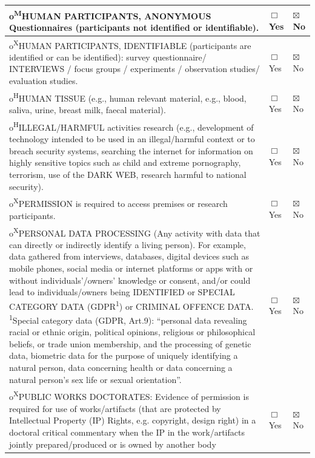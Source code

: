 \documentclass[12pt,a4paper]{article}
\begin{document}
\begin{longtable}{|p{10.3cm}|p{1.4cm}|p{1.4cm}|}
{\ttfamily o}\quad \textsuperscript{M}HUMAN PARTICIPANTS, ANONYMOUS Questionnaires (participants not identified or identifiable). & $\Box$ Yes & $\boxtimes$ No \\ \hline
{\ttfamily o}\quad \textsuperscript{X}HUMAN PARTICIPANTS, IDENTIFIABLE (participants are identified or can be identified): survey questionnaire/ INTERVIEWS / focus groups / experiments / observation studies/ evaluation studies. & $\Box$ Yes & $\boxtimes$ No \\ \hline
{\ttfamily o}\quad \textsuperscript{H}HUMAN TISSUE (e.g., human relevant material, e.g., blood, saliva, urine, breast milk, faecal material). & $\Box$ Yes & $\boxtimes$ No \\ \hline
{\ttfamily o}\quad \textsuperscript{H}ILLEGAL/HARMFUL activities research (e.g., development of technology intended to be used in an illegal/harmful context or to breach security systems, searching the internet for information on highly sensitive topics such as child and extreme pornography, terrorism, use of the DARK WEB, research harmful to national security). & $\Box$ Yes & $\boxtimes$ No \\ \hline
{\ttfamily o}\quad \textsuperscript{X}PERMISSION is required to access premises or research participants. & $\Box$ Yes & $\boxtimes$ No \\ \hline
{\ttfamily o}\quad \textsuperscript{X}PERSONAL DATA PROCESSING (Any activity with data that can directly or indirectly identify a living person). For example, data gathered from interviews, databases, digital devices such as mobile phones, social media or internet platforms or apps with or without individuals'/owners' knowledge or consent, and/or could lead to individuals/owners being IDENTIFIED or SPECIAL CATEGORY DATA (GDPR\textsuperscript{1}) or CRIMINAL OFFENCE DATA. \textsuperscript{1}Special category data (GDPR, Art.9): ``personal data revealing racial or ethnic origin, political opinions, religious or philosophical beliefs, or trade union membership, and the processing of genetic data, biometric data for the purpose of uniquely identifying a natural person, data concerning health or data concerning a natural person's sex life or sexual orientation''. & $\Box$ Yes & $\boxtimes$ No \\ \hline
{\ttfamily o}\quad \textsuperscript{X}PUBLIC WORKS DOCTORATES: Evidence of permission is required for use of works/artifacts (that are protected by Intellectual Property (IP) Rights, e.g. copyright, design right) in a doctoral critical commentary when the IP in the work/artifacts jointly prepared/produced or is owned by another body & $\Box$ Yes & $\boxtimes$ No \\ \hline

\end{longtable}
\end{document}

